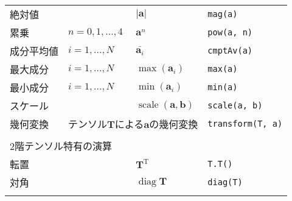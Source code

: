 \begin{longtable}{Xlll}
\index{mag@\verb+mag+!tensorのメンバかんすう@\OFclass{tensor}のメンバ関数}%
 絶対値 &  & $|\bm{a}|$ & \verb|mag(a)| \\
\index{tensorのメンバかんすう@\OFclass{tensor}のメンバ関数!pow@\verb+pow+}%
\index{pow@\verb+pow+!tensorのメンバかんすう@\OFclass{tensor}のメンバ関数}%
 累乗 & $n = 0, 1, \dots, 4$ & $\bm{a}^{n}$ & \verb|pow(a, n)| \\
\index{tensorのメンバかんすう@\OFclass{tensor}のメンバ関数!cmptAv@\verb+cmptAv+}%
\index{cmptAv@\verb+cmptAv+!tensorのメンバかんすう@\OFclass{tensor}のメンバ関数}%
 成分平均値 & $i = 1, \dots, N$ & $\bar{\bm{a}_{i}}$ & \verb|cmptAv(a)| \\
\index{tensorのメンバかんすう@\OFclass{tensor}のメンバ関数!max@\verb+max+}%
\index{max@\verb+max+!tensorのメンバかんすう@\OFclass{tensor}のメンバ関数}%
 最大成分 & $i = 1, \dots, N$ & $\max(\bm{a}_{i})$ & \verb|max(a)| \\
\index{tensorのメンバかんすう@\OFclass{tensor}のメンバ関数!min@\verb+min+}%
\index{min@\verb+min+!tensorのメンバかんすう@\OFclass{tensor}のメンバ関数}%
 最小成分 & $i = 1, \dots, N$ & $\min(\bm{a}_{i})$ & \verb|min(a)| \\
\index{tensorのメンバかんすう@\OFclass{tensor}のメンバ関数!scale@\verb+scale+}%
\index{scale@\verb+scale+!tensorのメンバかんすう@\OFclass{tensor}のメンバ関数}%
 スケール &  & $\mathop{\mathrm{scale}}(\bm{a}, \bm{b})$ & \verb|scale(a, b)| \\
\index{tensorのメンバかんすう@\OFclass{tensor}のメンバ関数!transform@\verb+transform+}%
\index{transform@\verb+transform+!tensorのメンバかんすう@\OFclass{tensor}のメンバ関数}%
 幾何変換 & \multicolumn{2}{r}{テンソル$\bm{T}$による$\bm{a}$の幾何変換} & \verb|transform(T, a)| \\
 \\
 \multicolumn{4}{l}{\sffamily\gtfamily 2階テンソル特有の演算} \\
 \hline
\index{tensorのメンバかんすう@\OFclass{tensor}のメンバ関数!T()@\verb+T()+}%
\index{T()@\verb+T()+!tensorのメンバかんすう@\OFclass{tensor}のメンバ関数}%
 転置 &  & $\bm{T}^{\mathrm{T}}$ & \verb|T.T()| \\
\index{tensorのメンバかんすう@\OFclass{tensor}のメンバ関数!diag@\verb+diag+}%
\index{diag@\verb+diag+!tensorのメンバかんすう@\OFclass{tensor}のメンバ関数}%
 対角 &  & $\mathop{\mathrm{diag}}\bm{T}$ & \verb|diag(T)| \\
\index{tensorのメンバかんすう@\OFclass{tensor}のメンバ関数!tr@\verb+tr+}%
\index{tr@\verb+tr+!tensorのメンバかんすう@\OFclass{tensor}のメンバ関数}%

\end{longtable}
